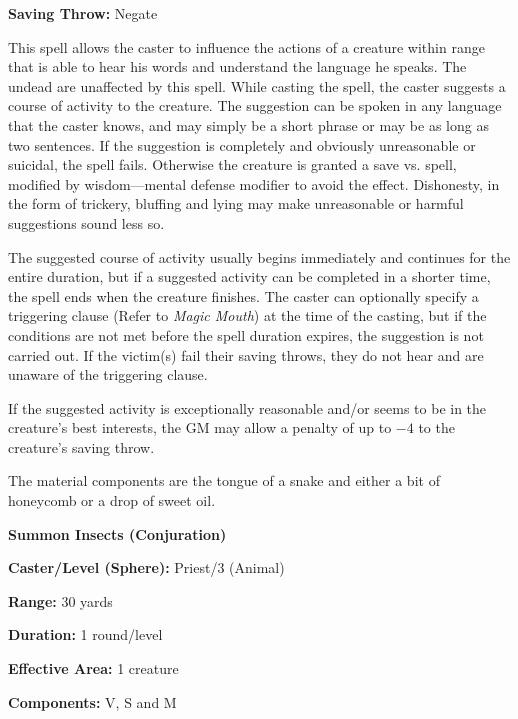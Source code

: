 \begin{multicols}{2}
\begin{minipage}{\columnwidth}
\noindent \textbf{Saving Throw:} Negate

\end{minipage}

This spell allows the caster to influence the actions of a creature within range that is able to hear his words and understand the language he speaks.  The undead are unaffected by this spell.  While casting the spell, the caster suggests a course of activity to the creature.  The suggestion can be spoken in any language that the caster knows, and may simply be a short phrase or may be as long as two sentences.  If the suggestion is completely and obviously unreasonable or suicidal, the spell fails.  Otherwise the creature is granted a save vs. spell, modified by wisdom---mental defense modifier to avoid the effect.  Dishonesty, in the form of trickery, bluffing and lying may make unreasonable or harmful suggestions sound less so. 

The suggested course of activity usually begins immediately and continues for the entire duration, but if a suggested activity can be completed in a shorter time, the spell ends when the creature finishes.  The caster can optionally specify a triggering clause (Refer to \textit{Magic Mouth}) at the time of the casting, but if the conditions are not met before the spell duration expires, the suggestion is not carried out.  If the victim(s) fail their saving throws, they do not hear and are unaware of the triggering clause.

If the suggested activity is exceptionally reasonable and/or seems to be in the creature's best interests, the GM may allow a penalty of up to $-4$ to the creature's saving throw.

The material components are the tongue of a snake and either a bit of honeycomb or a drop of sweet oil.

\vspace{1em}

\noindent
\begin{minipage}{\columnwidth}

\noindent \textbf{Summon Insects (Conjuration)}

\noindent \textbf{Caster/Level (Sphere):} Priest/3 (Animal)

\noindent \textbf{Range:} 30 yards

\noindent \textbf{Duration:} 1 round/level

\noindent \textbf{Effective Area:} 1 creature

\noindent \textbf{Components:} V, S and M


\end{minipage}
\end{multicols}
